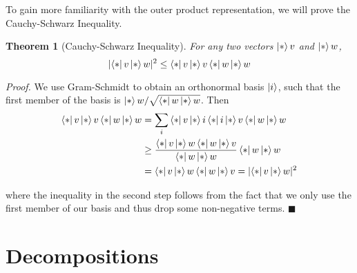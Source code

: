 \documentclass[a4paper,10pt]{book}
\theoremstyle{plain}
\newtheorem{theorem}{Theorem}[section]
\renewenvironment{proof}{\textsl{Proof.}}{\hfill$\blacksquare$}
\theoremstyle{plain}
\theoremstyle{definition}
\begin{document}
To gain more familiarity with the outer product representation, we will prove the Cauchy-Schwarz Inequality. 

\begin{theorem}[Cauchy-Schwarz Inequality]
For any two vectors $\ket*{v}$ and $\ket*{w}$, $$\lvert\bra*{v}\ket*{w}\rvert^{2} \leq \bra*{v}\ket*{v} \bra*{w}\ket*{w}$$
\end{theorem}

\begin{proof}
We use Gram-Schmidt to obtain an orthonormal basis $\ket{i}$, such that the first member of the basis is $\ket*{w} / \sqrt{\bra*{w}\ket*{w}}$. Then 
$$
\begin{aligned} 
\bra*{v}\ket*{v} \bra*{w}\ket*{w} &= \sum_{i} \bra*{v}\ket*{i} \bra*{i}\ket*{v} \bra*{w}\ket*{w} \\
&\geq \frac{\bra*{v}\ket*{w} \bra*{w}\ket*{v}}{\bra*{w}\ket*{w}} \bra*{w}\ket*{w} \\ 
&= \bra*{v}\ket*{w} \bra*{w}\ket*{v} = \lvert\bra*{v}\ket*{w}\rvert^{2}
\end{aligned}
$$

where the inequality in the second step follows from the fact that we only use the first member of our basis and thus drop some non-negative terms.
\end{proof}

\section{Decompositions}
\end{document}
